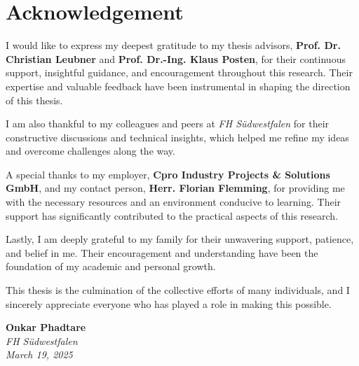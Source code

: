 
\chapter*{Acknowledgement}

\noindent
I would like to express my deepest gratitude to my thesis advisors, \textbf{Prof. Dr. Christian Leubner} and \textbf{Prof. Dr.-Ing. Klaus Posten}, for their continuous support, insightful guidance, and encouragement throughout this research. Their expertise and valuable feedback have been instrumental in shaping the direction of this thesis.

\noindent
I am also thankful to my colleagues and peers at \textit{FH Südwestfalen} for their constructive discussions and technical insights, which helped me refine my ideas and overcome challenges along the way.

\noindent
A special thanks to my employer, \textbf{Cpro Industry Projects \& Solutions GmbH}, and my contact person, \textbf{Herr. Florian Flemming}, for providing me with the necessary resources and an environment conducive to learning. Their support has significantly contributed to the practical aspects of this research.

\noindent
Lastly, I am deeply grateful to my family for their unwavering support, patience, and belief in me. Their encouragement and understanding have been the foundation of my academic and personal growth.

\noindent
This thesis is the culmination of the collective efforts of many individuals, and I sincerely appreciate everyone who has played a role in making this possible.

\vspace{1.5cm}
\noindent
\textbf{Onkar Phadtare} \\
\textit{FH Südwestfalen} \\
\textit{March 19, 2025}

